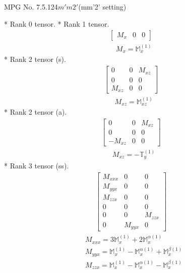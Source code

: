 \documentclass[fleqn,8pt,landscape]{jsarticle}
\begin{document}
\setcounter{MaxMatrixCols}{32}

\renewcommand{\tablename}{Table~}
\renewcommand{\figurename}{Figure~}
\begin{center}
\LARGE
MPG No. 7.5.124\quad$m'm2'$\quad(mm'2' setting)
\end{center}
* Rank 0 tensor.
* Rank 1 tensor.
\begin{align*}
\begin{bmatrix} M_{x} & 0 & 0 \end{bmatrix}
\end{align*}
\begin{align*}
& M_{x} = \mathbb{M}_{x}^{(1)}
\end{align*}
* Rank 2 tensor (s).
\begin{align*}
\begin{bmatrix} 0 & 0 & M_{xz} \\ 0 & 0 & 0 \\ M_{xz} & 0 & 0 \end{bmatrix}
\end{align*}
\begin{align*}
& M_{xz} = \mathbb{M}_{xz}^{(1)}
\end{align*}
* Rank 2 tensor (a).
\begin{align*}
\begin{bmatrix} 0 & 0 & M_{xz} \\ 0 & 0 & 0 \\ - M_{xz} & 0 & 0 \end{bmatrix}
\end{align*}
\begin{align*}
& M_{xz} = - \mathbb{T}_{y}^{(1)}
\end{align*}
* Rank 3 tensor (ss).
\begin{align*}
\begin{bmatrix} M_{xxx} & 0 & 0 \\ M_{yyx} & 0 & 0 \\ M_{zzx} & 0 & 0 \\ 0 & 0 & 0 \\ 0 & 0 & M_{zzx} \\ 0 & M_{yyx} & 0 \end{bmatrix}
\end{align*}
\begin{align*}
& M_{xxx} = 3 \mathbb{M}_{x}^{(1)} + 2 \mathbb{M}_{x}^{\alpha(1)} \\
& M_{yyx} = \mathbb{M}_{x}^{(1)} - \mathbb{M}_{x}^{\alpha(1)} + \mathbb{M}_{x}^{\beta(1)} \\
& M_{zzx} = \mathbb{M}_{x}^{(1)} - \mathbb{M}_{x}^{\alpha(1)} - \mathbb{M}_{x}^{\beta(1)}
\end{align*}
\end{document}
